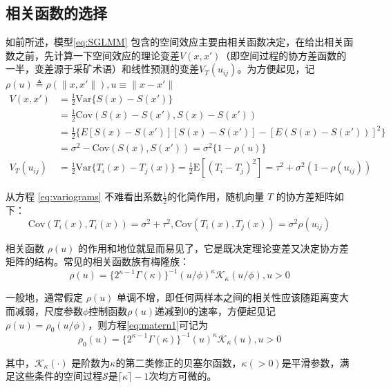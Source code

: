 \documentclass[hyperref, a4paper, UTF8, zihao = -4, linespread = 1.25, scheme = chinese]{ctexbook}
\begin{document}
\subsection{相关函数的选择}

如前所述，模型\eqref{eq:SGLMM}
包含的空间效应主要由相关函数决定，在给出相关函数之前，先计算一下空间效应的理论变差\(V(x,x')\)（即空间过程的协方差函数的一半，变差源于采矿术语）和线性预测的变差\(V_{T}(u_{ij})\)。为方便起见，记\(\rho(u) \triangleq \rho(\|x,x'\|),u \equiv \|x-x'\|\)
\begin{equation}
\begin{aligned}
V(x,x')&=\frac{1}{2}\mathrm{Var}\{S(x)-S(x')\}\\
&=\frac{1}{2}\mathrm{Cov}(S(x)-S(x'),S(x)-S(x'))\\
&=\frac{1}{2}\{E[S(x)-S(x')][S(x)-S(x')]-[E(S(x)-S(x'))]^2\}\\
&=\sigma^2-\mathrm{Cov}(S(x),S(x'))=\sigma^2\{1-\rho(u)\}\\
V_{T}(u_{ij})&=\frac{1}{2}\mathrm{Var}\{T_{i}(x)-T_{j}(x)\}
=\frac{1}{2}\mathrm{E}[(T_{i}-T_{j})^2]=\tau^2+\sigma^2(1-\rho(u_{ij})) \label{eq:variograms}
\end{aligned}
\end{equation}

从方程 \eqref{eq:variograms}
不难看出系数\(\frac{1}{2}\)的化简作用，随机向量 \(T\)
的协方差矩阵如下：\[\mathrm{Cov}(T_{i}(x),T_{i}(x)) = \sigma^2+\tau^2, \mathrm{Cov}(T_{i}(x),T_{j}(x))=\sigma^2\rho(u_{ij})\]

相关函数 \(\rho(u)\)
的作用和地位就显而易见了，它是既决定理论变差又决定协方差矩阵的结构。常见的相关函数族有梅隆族：\begin{equation}
\rho(u)=\{2^{\kappa -1}\Gamma(\kappa)\}^{-1}(u/\phi)^{\kappa}\mathcal{K}_{\kappa}(u/\phi),u > 0 \label{eq:matern1}
\end{equation}

一般地，通常假定 \(\rho(u)\)
单调不增，即任何两样本之间的相关性应该随距离变大而减弱，尺度参数\(\phi\)控制函数\(\rho(u)\)递减到0的速率，方便起见记
\(\rho(u) = \rho_{0}(u/\phi)\)，则方程\eqref{eq:matern1}可记为\begin{equation}
\rho_{0}(u)=\{2^{\kappa -1}\Gamma(\kappa)\}^{-1}(u)^{\kappa}\mathcal{K}_{\kappa}(u),u > 0 \label{eq:matern2}
\end{equation}

其中，\(\mathcal{K}_{\kappa}(\cdot)\)
是阶数为\(\kappa\)的第二类修正的贝塞尔函数，\(\kappa(>0)\)是平滑参数，满足这些条件的空间过程\(\mathcal{S}\)是\(\lceil\kappa\rceil-1\)次均方可微的。
\end{document}
